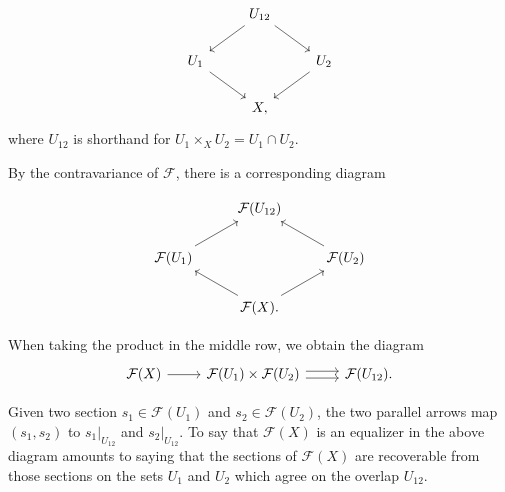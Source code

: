 \[\begin{tikzcd}
	& {U_{12}} \\
	{U_1} && {U_2} \\
	& X,
	\arrow[from=1-2, to=2-1]
	\arrow[from=1-2, to=2-3]
	\arrow[from=2-1, to=3-2]
	\arrow[from=2-3, to=3-2]
\end{tikzcd}\]
where $U_{12}$ is shorthand for $U_1 \times_X U_2 = U_1 \cap U_2$.

By the contravariance of $\mathcal{F}$, there is a corresponding diagram

\[\begin{tikzcd}
	& {\mathcal{F}(U_{12})} \\
	{\mathcal{F}(U_1)} && {\mathcal{F}(U_2)} \\
	& {\mathcal{F}(X)}.
	\arrow[from=2-1, to=1-2]
	\arrow[from=2-3, to=1-2]
	\arrow[from=3-2, to=2-1]
	\arrow[from=3-2, to=2-3]
\end{tikzcd}\]

When taking the product in the middle row, we obtain the diagram 
\[\begin{tikzcd}
	{\mathcal{F}(X)} & {\mathcal{F}(U_1)\times\mathcal{F}(U_2)} & {\mathcal{F}(U_{12})}.
	\arrow[from=1-1, to=1-2]
	\arrow[shift right=1, from=1-2, to=1-3]
	\arrow[shift left=1, from=1-2, to=1-3]
\end{tikzcd}\]

Given two section $s_1 \in \mathcal{F}(U_1)$ and $s_2 \in \mathcal{F}(U_2)$, the two parallel arrows map $(s_1, s_2)$ to $s_1|_{U_{12}}$ and $s_2|_{U_{12}}$. To say that $\mathcal{F}(X)$ is an equalizer in the above diagram amounts to saying that the sections of $\mathcal{F}(X)$ are recoverable from those sections on the sets $U_1$ and $U_2$ which agree on the overlap $U_{12}$.


